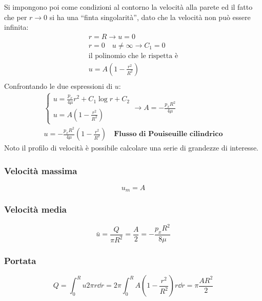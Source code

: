 Si impongono poi come condizioni al contorno la velocità alla parete ed il fatto che per $r \rightarrow 0$ si ha una ``finta singolarità'', dato che la velocità non può essere infinita:
%
	\begin{equation*}
		\begin{gathered}
			r = R \rightarrow u = 0\\
			r = 0 \quad u \neq \infty \rightarrow C_1 = 0\\
			\text{il polinomio che le rispetta è}\\
			u = A \left( 1 - \frac{r^2}{R^2} \right)\\
		\end{gathered}
	\end{equation*}
Confrontando le due espressioni di $u$:
	\begin{equation*}
		\begin{gathered}
			\left\{
				\begin{aligned}
					u = \frac{p_x}{4 \mu} r^2 + C_1 \log{r}  + C_2\\
					u = A \left( 1 - \frac{r^2}{R^2} \right)
				\end{aligned}
			\right.
			\rightarrow
			A = - \frac{p_x R^2}{4 \mu}\\
			u = - \frac{p_x R^2}{4 \mu} \left( 1 - \frac{r^2}{R^2} \right) \quad \textbf{Flusso di Pouiseuille cilindrico}
		\end{gathered}
	\end{equation*}	
%
Noto il profilo di velocità è possibile calcolare una serie di grandezze di interesse.

\subsubsection{Velocità massima}
%
	\begin{equation*}
		u_m = A
	\end{equation*}
%

\subsubsection{Velocità media}
%
	\begin{equation*}
		\bar{u} = \frac{Q}{\pi R^2} = \frac{A}{2} = - \frac{p_x R^2}{8 \mu}
	\end{equation*}
%

\subsubsection{Portata}
%
	\begin{equation*}
		Q = \int_0^R u 2 \pi r \dd{r} = 2 \pi \int_0^R A \left( 1 - \frac{r^2}{R^2} \right) r \dd{r} = \pi \frac{A R^2}{2}
	\end{equation*}
%

